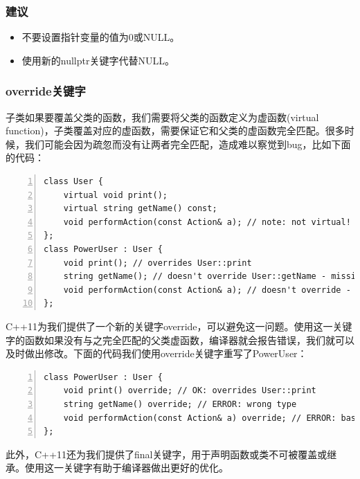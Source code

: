 \documentclass{ctexart}
\begin{document}
\subsubsection*{建议}

\begin{itemize}
	\item 不要设置指针变量的值为0或NULL。
	\item 使用新的nullptr关键字代替NULL。
\end{itemize}

\subsubsection{override关键字}

子类如果要覆盖父类的函数，我们需要将父类的函数定义为虚函数(virtual function)，子类覆盖对应的虚函数，需要保证它和父类的虚函数完全匹配。很多时候，我们可能会因为疏忽而没有让两者完全匹配，造成难以察觉到bug，比如下面的代码：

\begin{lstlisting}[language={[ANSI]C},keywordstyle=\color{blue!70},commentstyle=\color{red!50!green!50!blue!50},frame=shadowbox, rulesepcolor=\color{red!20!green!20!blue!20},basicstyle=\small,numbers=left, numberstyle=\tiny,breaklines=true]
class User {
	virtual void print();  
	virtual string getName() const;  
	void performAction(const Action& a); // note: not virtual!
};
class PowerUser : User {
	void print(); // overrides User::print
	string getName(); // doesn't override User::getName - missing const
	void performAction(const Action& a); // doesn't override - base func not virtual  
};
\end{lstlisting}

C++11为我们提供了一个新的关键字override，可以避免这一问题。使用这一关键字的函数如果没有与之完全匹配的父类虚函数，编译器就会报告错误，我们就可以及时做出修改。下面的代码我们使用override关键字重写了PowerUser：

\begin{lstlisting}[language={[ANSI]C},keywordstyle=\color{blue!70},commentstyle=\color{red!50!green!50!blue!50},frame=shadowbox, rulesepcolor=\color{red!20!green!20!blue!20},basicstyle=\small,numbers=left, numberstyle=\tiny,breaklines=true]
class PowerUser : User {
	void print() override; // OK: overrides User::print
	string getName() override; // ERROR: wrong type
	void performAction(const Action& a) override; // ERROR: base func not virtual  
};
\end{lstlisting}

此外，C++11还为我们提供了final关键字，用于声明函数或类不可被覆盖或继承。使用这一关键字有助于编译器做出更好的优化。
\end{document}

